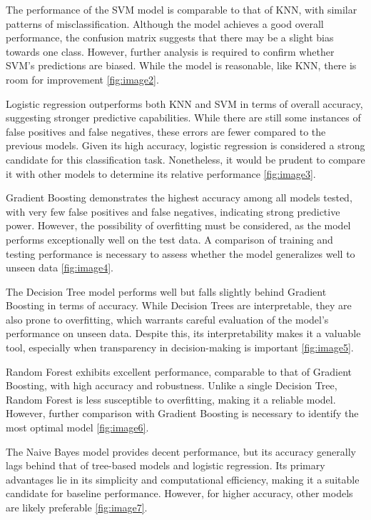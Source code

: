 \documentclass[pdflatex,sn-nature,Numbered]{sn-jnl}%
\theoremstyle{thmstyleone}%
\theoremstyle{thmstyletwo}%
\theoremstyle{thmstylethree}%
\begin{document}
The performance of the SVM model is comparable to that of KNN, with similar patterns of misclassification. Although the model achieves a good overall performance, the confusion matrix suggests that there may be a slight bias towards one class. However, further analysis is required to confirm whether SVM's predictions are biased. While the model is reasonable, like KNN, there is room for improvement \autoref{fig:image2}. 

Logistic regression outperforms both KNN and SVM in terms of overall accuracy, suggesting stronger predictive capabilities. While there are still some instances of false positives and false negatives, these errors are fewer compared to the previous models. Given its high accuracy, logistic regression is considered a strong candidate for this classification task. Nonetheless, it would be prudent to compare it with other models to determine its relative performance \autoref{fig:image3}.

Gradient Boosting demonstrates the highest accuracy among all models tested, with very few false positives and false negatives, indicating strong predictive power. However, the possibility of overfitting must be considered, as the model performs exceptionally well on the test data. A comparison of training and testing performance is necessary to assess whether the model generalizes well to unseen data \autoref{fig:image4}.

The Decision Tree model performs well but falls slightly behind Gradient Boosting in terms of accuracy. While Decision Trees are interpretable, they are also prone to overfitting, which warrants careful evaluation of the model's performance on unseen data. Despite this, its interpretability makes it a valuable tool, especially when transparency in decision-making is important \autoref{fig:image5}.

Random Forest exhibits excellent performance, comparable to that of Gradient Boosting, with high accuracy and robustness. Unlike a single Decision Tree, Random Forest is less susceptible to overfitting, making it a reliable model. However, further comparison with Gradient Boosting is necessary to identify the most optimal model \autoref{fig:image6}.

The Naive Bayes model provides decent performance, but its accuracy generally lags behind that of tree-based models and logistic regression. Its primary advantages lie in its simplicity and computational efficiency, making it a suitable candidate for baseline performance. However, for higher accuracy, other models are likely preferable \autoref{fig:image7}.
\end{document}

